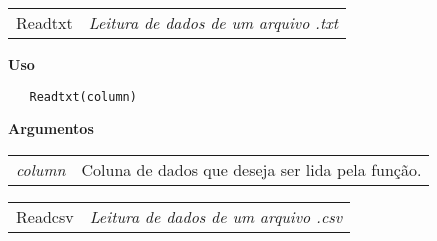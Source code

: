 \documentclass[12pt,letterpaper]{article}
\begin{document}
\hrulefill   

\begin{table}[!h]
\begin{center}
\begin{tabularx}{\textwidth}{ X X}
\hspace{0.5cm} Readtxt & \textit{Leitura de dados de um arquivo .txt}\\
\end{tabularx}
\end{center}
\end{table} 

\vspace{-0.5cm}

\hrulefill  

\vspace{0.5cm}

\textbf{Uso}

\begin{lstlisting}
   Readtxt(column)
\end{lstlisting}

\vspace{0.5cm}

\textbf{Argumentos}

\begin{table}[!h]
\begin{center}
\begin{tabularx}{\textwidth}{X X}
\hspace{0.5cm} \textit{column} & Coluna de dados que deseja ser lida pela função.\\
\end{tabularx}
\end{center}
\end{table} 

\newpage



\hrulefill   

\begin{table}[!h]
\begin{center}
\begin{tabularx}{\textwidth}{ X X}
\hspace{0.5cm} Readcsv & \textit{Leitura de dados de um arquivo .csv}\\
\end{tabularx}
\end{center}
\end{table} 

\vspace{-0.5cm}
\end{document}
